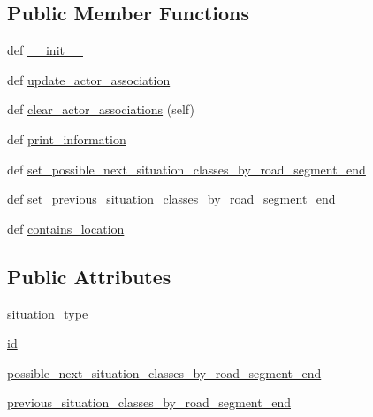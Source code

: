 \subsection*{Public Member Functions}
\begin{DoxyCompactItemize}
\item 
def \hyperlink{classimplementation_1_1actor__situation__class__detection_1_1situation__class_1_1_situation_class_abf95e1ac7cb510f64a748821db95aff8}{\+\_\+\+\_\+init\+\_\+\+\_\+}
\item 
def \hyperlink{classimplementation_1_1actor__situation__class__detection_1_1situation__class_1_1_situation_class_abe7a6160a04aec28f7d4ad4ede854142}{update\+\_\+actor\+\_\+association}
\item 
def \hyperlink{classimplementation_1_1actor__situation__class__detection_1_1situation__class_1_1_situation_class_a78453f97c4d88f23beffccd6d6737e77}{clear\+\_\+actor\+\_\+associations} (self)
\item 
def \hyperlink{classimplementation_1_1actor__situation__class__detection_1_1situation__class_1_1_situation_class_a5cb0c30076bcc15f8fede647f246bf9b}{print\+\_\+information}
\item 
def \hyperlink{classimplementation_1_1actor__situation__class__detection_1_1situation__class_1_1_situation_class_a2d1b817a4d39a19f1c0155eb2323b739}{set\+\_\+possible\+\_\+next\+\_\+situation\+\_\+classes\+\_\+by\+\_\+road\+\_\+segment\+\_\+end}
\item 
def \hyperlink{classimplementation_1_1actor__situation__class__detection_1_1situation__class_1_1_situation_class_ac1e44fe3336feab956b59c4d50ed6292}{set\+\_\+previous\+\_\+situation\+\_\+classes\+\_\+by\+\_\+road\+\_\+segment\+\_\+end}
\item 
def \hyperlink{classimplementation_1_1actor__situation__class__detection_1_1situation__class_1_1_situation_class_adb026e9ec4686a17e24b9e496703907e}{contains\+\_\+location}
\end{DoxyCompactItemize}
\subsection*{Public Attributes}
\begin{DoxyCompactItemize}
\item 
\hyperlink{classimplementation_1_1actor__situation__class__detection_1_1situation__class_1_1_situation_class_a2782b467e701c72c8a445cfe7284f585}{situation\+\_\+type}
\item 
\hyperlink{classimplementation_1_1actor__situation__class__detection_1_1situation__class_1_1_situation_class_a27d4d3259b8bb96107692e2b936ce801}{id}
\item 
\hyperlink{classimplementation_1_1actor__situation__class__detection_1_1situation__class_1_1_situation_class_a932a0f38eb6274f6d5f9812175f0365e}{possible\+\_\+next\+\_\+situation\+\_\+classes\+\_\+by\+\_\+road\+\_\+segment\+\_\+end}
\item 
\hyperlink{classimplementation_1_1actor__situation__class__detection_1_1situation__class_1_1_situation_class_add0a7a31f57b145a0c5af43ee596cb93}{previous\+\_\+situation\+\_\+classes\+\_\+by\+\_\+road\+\_\+segment\+\_\+end}
\end{DoxyCompactItemize}


